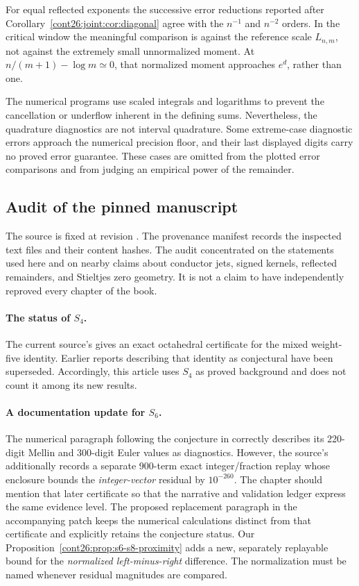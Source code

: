 For equal reflected exponents the successive error reductions reported
after Corollary~\ref{cont26:joint:cor:diagonal} agree with the $n^{-1}$ and
$n^{-2}$ orders. In the critical window the meaningful comparison is
against the reference scale $L_{n,m}$, not against the extremely small
unnormalized moment. At $n/(m+1)-\log m\simeq0$, that normalized moment
approaches $e^d$, rather than one.

The numerical programs use scaled integrals and logarithms to prevent
the cancellation or underflow inherent in the defining sums.
Nevertheless, the quadrature diagnostics are not interval quadrature.
Some extreme-case diagnostic errors approach the numerical precision
floor, and their last displayed digits carry no proved error guarantee.
These cases are omitted from the plotted error comparisons and from
judging an empirical power of the remainder.

\subsection{Audit of the pinned manuscript}

The source is fixed at revision
.
The provenance manifest records the inspected text files and their
content hashes. The audit concentrated on the statements used here
and on nearby claims about conductor jets, signed kernels, reflected
remainders, and Stieltjes zero geometry. It is not a claim to have
independently reproved every chapter of the book.

\paragraph{The status of $S_4$.}
The current source's  gives an exact
octahedral certificate for the mixed weight-five identity. Earlier
reports describing that identity as conjectural have been superseded.
Accordingly, this article uses $S_4$ as proved background and does
not count it among its new results.

\paragraph{A documentation update for $S_6$.}
The numerical paragraph following the conjecture in
 correctly describes its
220-digit Mellin and 300-digit Euler values as diagnostics. However,
the source's  additionally records a separate
900-term exact integer/fraction replay whose enclosure bounds the
\emph{integer-vector} residual by $10^{-260}$.
The chapter should mention that later certificate so that the
narrative and validation ledger express the same evidence level.
The proposed replacement paragraph in the accompanying patch keeps
the numerical calculations distinct from that certificate and
explicitly retains the conjecture status. Our
Proposition~\ref{cont26:prop:s6-s8-proximity} adds a new, separately replayable
bound for the \emph{normalized left-minus-right} difference.
The normalization must be named whenever residual magnitudes are
compared.

